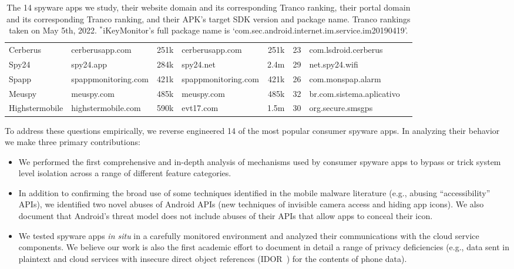 \documentclass[sigconf,balance=false]{acmart}
\newcommand{\ltgrey}{\rowcolor[gray]{0.88}}
\begin{document}
\begin{table*}[t]
\begin{tabular}{@{}llrlrll@{\hskip 5pt}l}
    \ltgrey Cerberus     &cerberusapp.com          &251k            & cerberusapp.com  &251k                         &23             &com.lsdroid.cerberus                            \\
    \ltgrey Spy24        &spy24.app                &284k            & spy24.net  &2.4m                               &29          &net.spy24.wifi                                  \\
    \ltgrey Spapp        &spappmonitoring.com      &421k            &spappmonitoring.com  &421k                      &26                  &com.monspap.alarm                               \\
    Meuspy               &meuspy.com               &485k            & meuspy.com  &485k                              &32        &br.com.sistema.aplicativo                       \\
    Highstermobile       &highstermobile.com       &590k            &evt17.com  &1.5m                                &30       &org.secure.smsgps                               \\
  \end{tabular}
  \caption{The 14 spyware apps we study, their website domain and its corresponding Tranco ranking, their portal domain and its corresponding Tranco ranking, and their APK's target SDK version and package name. Tranco rankings taken on May 5th, 2022. \hspace*{0.05in} $^{*}$iKeyMonitor's full package name is `com.sec.android.internet.im.service.im20190419'.
  \label{tab:apps_selected}}
\end{table*}


To address these questions empirically, we reverse engineered 14 of
the most popular consumer spyware apps.  In analyzing their behavior
we make three primary contributions:
\begin{itemize}
  \item We performed the first comprehensive and in-depth analysis of mechanisms used by consumer spyware apps to bypass or trick system level isolation across a range of different feature categories.
  \item In addition to confirming the broad use of some techniques identified in the mobile malware literature (e.g., abusing ``accessibility'' APIs), we identified two novel abuses of Android
    APIs (new techniques of invisible camera access and hiding app icons). We also document that Android's threat model does not include abuses of their APIs that allow apps to conceal their icon.
  \item We tested spyware apps \emph{in
  situ} in a carefully monitored environment and analyzed their communications with the cloud service components.  We believe our work is also the first academic effort to document in detail a range of privacy deficiencies (e.g.,
  data sent in plaintext and cloud services with insecure direct object references (IDOR~\cite{IDOR62:online, IDORCWE:online}) for the contents of phone data).
\end{itemize}
\end{document}
